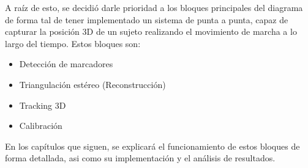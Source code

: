  A raíz de esto, se decidió darle prioridad a los bloques principales del diagrama de forma tal de tener implementado un sistema de punta a punta, capaz de capturar la posición 3D de un sujeto realizando el movimiento de marcha a lo largo del tiempo. Estos bloques son:
 \begin{itemize}
 	\item Detección de marcadores
 	\item Triangulación estéreo (Reconstrucción)
 	\item Tracking 3D
 	\item Calibración
 \end{itemize}

En los capítulos que siguen, se explicará el funcionamiento de estos bloques de forma detallada, asi como su implementación y el análisis de resultados.